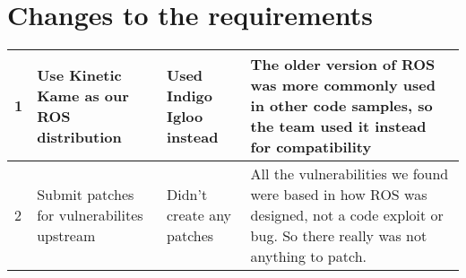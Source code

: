\documentclass[IEEEtran,letterpaper,10pt,notitlepage,draftclsnofoot,onecolumn]{article}
\begin{document}
\begin{sloppypar}
\section{Changes to the requirements}
\begin{tabular}{|p{.1cm}|l|p{2cm}| p{5cm} |} 
 \hline
 1 & Use Kinetic Kame as our ROS distribution & Used Indigo Igloo instead & The older version of ROS was more commonly used in other code samples, so the team used it instead for compatibility\\
 \hline
 2 & Submit patches for vulnerabilites upstream & Didn't create any patches & All the vulnerabilities we found were based in how ROS was designed, not a code exploit or bug. So there really was not anything to patch.\\
 \hline
\end{tabular}
\end{sloppypar}
%
\end{document}
